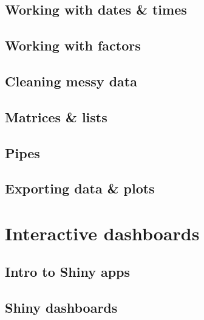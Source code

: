 \documentclass[
]{book}
\begin{document}
\hypertarget{working-with-dates-times}{%
\chapter{Working with dates \& times}\label{working-with-dates-times}}

\hypertarget{working-with-factors}{%
\chapter{Working with factors}\label{working-with-factors}}

\hypertarget{cleaning-messy-data}{%
\chapter{Cleaning messy data}\label{cleaning-messy-data}}

\hypertarget{matrices-lists}{%
\chapter{Matrices \& lists}\label{matrices-lists}}

\hypertarget{pipes}{%
\chapter{Pipes}\label{pipes}}

\hypertarget{exporting-data-plots}{%
\chapter{Exporting data \& plots}\label{exporting-data-plots}}

\hypertarget{part-interactive-dashboards}{%
\part{Interactive dashboards}\label{part-interactive-dashboards}}

\hypertarget{intro-to-shiny-apps}{%
\chapter{Intro to Shiny apps}\label{intro-to-shiny-apps}}

\hypertarget{shiny-dashboards}{%
\chapter{Shiny dashboards}\label{shiny-dashboards}}
\end{document}
